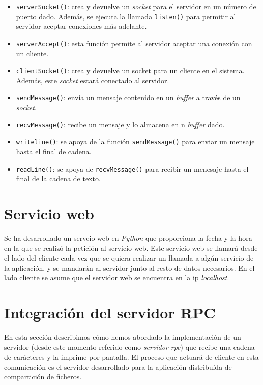 \documentclass[]{article}
\begin{document}
\begin{itemize}
    \item \texttt{serverSocket()}: crea y devuelve un \textit{socket} para el servidor en un número de puerto dado. Además, se ejecuta la llamada \texttt{listen()} para permitir al servidor aceptar conexiones más adelante. 
    \item \texttt{serverAccept()}: esta función permite al servidor aceptar una conexión con un cliente. 
    \item \texttt{clientSocket()}: crea y devuelve un socket para un cliente en el sistema. Además, este \textit{socket} estará conectado al servidor. 
    \item \texttt{sendMessage()}: envía un mensaje contenido en un \textit{buffer} a través de un \textit{socket}. 
    \item \texttt{recvMessage()}: recibe un mensaje y lo almacena en n \textit{buffer} dado. 
    \item \texttt{writeline()}: se apoya de la función \texttt{sendMessage()} para enviar un mensaje hasta el final de cadena.
    \item \texttt{readLine()}: se apoya de \texttt{recvMessage()} para recibir un menesaje hasta el final de la cadena de texto.
\end{itemize}

\section{Servicio web}
\label{sec:web_service}
Se ha desarrollado un servcio web en \textit{Python} que proporciona la fecha y la hora en la que se realizó la petición al servicio web.
Este servicio web se llamará desde el lado del cliente cada vez que se quiera realizar un llamada a algún servicio de la aplicación, y se mandarán al servidor junto al resto de datos necesarios.
En el lado cliente se asume que el servidor web se encuentra en la ip \textit{localhost}.

\section{Integración del servidor RPC}
\label{sec:rpc}
En esta sección describimos cómo hemos abordado la implementación de un servidor (desde este momento referido como \textit{servidor rpc}) que recibe una cadena de carácteres y la imprime por pantalla. El proceso que actuará de cliente en esta comunicación es el servidor desarrollado para la aplicación distribuída de compartición de ficheros. 
\end{document}

